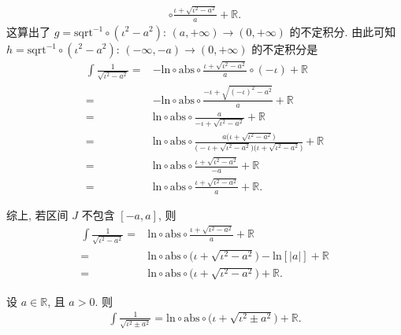 \begin{example}
\begin{align*}
        \circ \frac{\iota + \sqrt{\iota^2 - a^2}}{a} + \mathbb{R}.
    \end{align*}
    这算出了 $g = \mathrm{sqrt}^{-1} \circ (\iota^2 - a^2)$: $(a, +\infty) \to (0, +\infty)$ 的不定积分. 由此可知 $h = \mathrm{sqrt}^{-1} \circ (\iota^2 - a^2)$: $(-\infty, -a) \to (0, +\infty)$ 的不定积分是
    \begin{align*}
        \int {\frac{1}{\sqrt{\iota^2 - a^2}}}
        = {} & {-\mathrm{ln}} \circ \mathrm{abs}
        \circ \frac{\iota + \sqrt{\iota^2 - a^2}}{a} \circ (-\iota)
        + \mathbb{R}                                          \\
        = {} & {-\mathrm{ln}} \circ \mathrm{abs}
        \circ \frac{-\iota + \sqrt{(-\iota)^2 - a^2}}{a}
        + \mathbb{R}                                          \\
        = {} & \mathrm{ln} \circ \mathrm{abs}
        \circ \frac{a}{-\iota + \sqrt{\iota^2 - a^2}}
        + \mathbb{R}                                          \\
        = {} & \mathrm{ln} \circ \mathrm{abs}
        \circ \frac{a \big(\iota + \sqrt{\iota^2 - a^2} \big)}
        {\big(-\iota + \sqrt{\iota^2 - a^2} \big)
        \big(\iota + \sqrt{\iota^2 - a^2} \big)} + \mathbb{R} \\
        = {} & \mathrm{ln} \circ \mathrm{abs}
        \circ \frac{\iota + \sqrt{\iota^2 - a^2}}{-a}
        + \mathbb{R}                                          \\
        = {} & \mathrm{ln} \circ \mathrm{abs}
        \circ \frac{\iota + \sqrt{\iota^2 - a^2}}{a}
        + \mathbb{R}.
    \end{align*}

    综上, 若区间 $J$ 不包含 $[-a, a]$, 则
    \begin{align*}
        \int {\frac{1}{\sqrt{\iota^2 - a^2}}}
        = {} & \mathrm{ln} \circ \mathrm{abs}
        \circ \frac{\iota + \sqrt{\iota^2 - a^2}}{a}
        + \mathbb{R}                          \\
        = {} & \mathrm{ln} \circ \mathrm{abs}
        \circ \big( \iota + \sqrt{\iota^2 - a^2} \big)
        - \mathrm{ln}[|a|] + \mathbb{R}       \\
        = {} & \mathrm{ln} \circ \mathrm{abs}
        \circ \big( \iota + \sqrt{\iota^2 - a^2} \big)
        + \mathbb{R}.
    \end{align*}
\end{example}

\begin{remark}
    设 $a \in \mathbb{R}$, 且 $a > 0$. 则
    \begin{align*}
        \int {\frac{1}{\sqrt{\iota^2 \pm a^2}}} = \mathrm{ln} \circ \mathrm{abs} \circ \big( \iota + \sqrt{\iota^2 \pm a^2} \big) + \mathbb{R}.
    \end{align*}
\end{remark}

